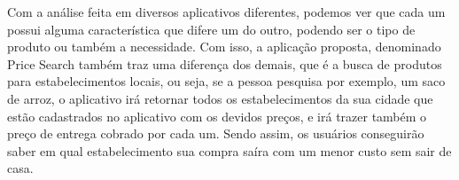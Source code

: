 Com a análise feita em diversos aplicativos diferentes, podemos ver que cada um possui alguma característica que difere um do outro, podendo ser o tipo de produto ou também a necessidade. Com isso, a aplicação proposta, denominado Price Search também traz uma diferença dos demais, que é a busca de produtos para estabelecimentos locais, ou seja, se a pessoa pesquisa por exemplo, um saco de arroz, o aplicativo irá retornar todos os estabelecimentos da sua cidade que estão cadastrados no aplicativo com os devidos preços, e irá trazer também o preço de entrega cobrado por cada um. Sendo assim, os usuários conseguirão saber em qual estabelecimento sua compra saíra com um menor custo sem sair de casa.
